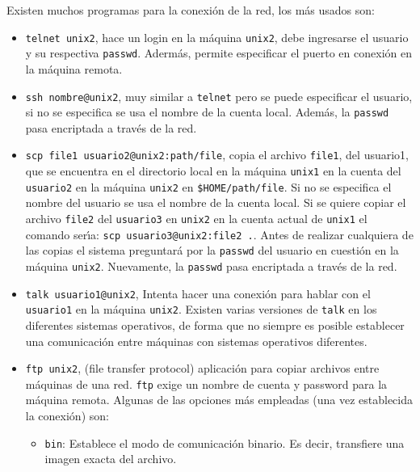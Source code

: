Existen muchos programas para la conexi{\'o}n de la red, los m{\'a}s usados
son:

\begin{itemize}
  
\item \verb+telnet unix2+, hace un login en la m{\'a}quina \verb+unix2+,
  debe ingresarse el usuario y su respectiva \verb+passwd+. Aderm{\'a}s,
  permite especificar el puerto en conexi{\'o}n en la m{\'a}quina remota.
  
\item \verb+ssh nombre@unix2+, muy similar a \verb+telnet+ pero se
  puede especificar el usuario, si no se especifica se usa el nombre
  de la cuenta local. Adem{\'a}s, la \verb+passwd+ pasa encriptada a
  trav{\'e}s de la red.

  
\item \verb+scp file1 usuario2@unix2:path/file+, copia el archivo
  \verb+file1+, del usuario1, que se encuentra en el directorio local
  en la m{\'a}quina \verb+unix1+ en la cuenta del \verb+usuario2+ en la
  m{\'a}quina \verb+unix2+ en {\tt \$HOME/path/file}. Si no se especifica
  el nombre del usuario se usa el nombre de la cuenta local. Si se
  quiere copiar el archivo \verb+file2+ del \verb+usuario3+ en
  \verb+unix2+ en la cuenta actual de \verb+unix1+ el comando
  ser{\'\i}a: \verb+scp usuario3@unix2:file2 .+.  Antes de realizar
  cualquiera de las copias el sistema preguntar{\'a} por la \verb+passwd+
  del usuario en cuesti{\'o}n en la m{\'a}quina \verb+unix2+.  Nuevamente, la
  \verb+passwd+ pasa encriptada a trav{\'e}s de la red.

\item \verb+talk usuario1@unix2+, Intenta hacer una conexi{\'o}n para
  hablar con el \verb+usuario1+ en la m{\'a}quina \verb+unix2+. Existen varias
  versiones de \verb+talk+ en los diferentes sistemas operativos, de forma
  que no siempre es posible establecer una comunicaci{\'o}n entre
  m{\'a}quinas con sistemas operativos diferentes.

  
\item \verb+ftp unix2+, (file transfer protocol) aplicaci{\'o}n para
  copiar archivos entre m{\'a}quinas de una red. \verb+ftp+ exige un
  nombre de cuenta y password para la m{\'a}quina remota. Algunas de las
  opciones m{\'a}s empleadas (una vez establecida la conexi{\'o}n) son:

\begin{itemize}
\item \verb+bin+: Establece el modo de comunicaci{\'o}n binario. Es decir,
  transfiere una imagen exacta del archivo.
  

\end{itemize}
\end{itemize}
